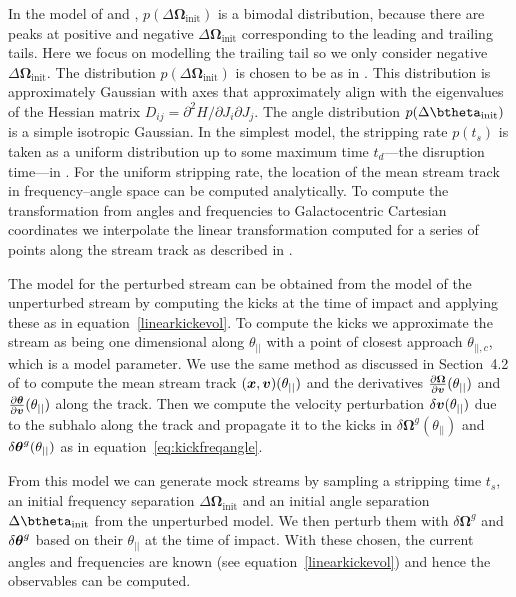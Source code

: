 \documentclass[useAMS,usenatbib,fleqn,a4paper]{mn2e}
\newcommand{\bs}[1]{\bmath{#1}}
\begin{document}
In the model of \cite{Bovy2014} and \cite{Sanders2014}, $p(\Delta\boldsymbol{\Omega}_\mathrm{init})$ is a bimodal distribution, because there are peaks at positive and negative $\Delta\boldsymbol{\Omega}_\mathrm{init}$ corresponding to the leading and trailing tails. Here we focus on modelling the trailing tail so we only consider negative $\Delta\boldsymbol{\Omega}_\mathrm{init}$. The distribution $p(\Delta\boldsymbol{\Omega}_\mathrm{init})$ is chosen to be as in \cite{Bovy2014}. This distribution is approximately Gaussian with axes that approximately align with the eigenvalues of the Hessian matrix $D_{ij}=\partial^2H/\partial J_i\partial J_j$. The angle distribution $p(\Delta\btheta_\mathrm{init})$ is a simple isotropic Gaussian. In the simplest model, the stripping rate $p(t_s)$ is taken as a uniform distribution up to some maximum time $t_d$---the disruption time---in \cite{Bovy2014}. For the uniform stripping rate, the location of the mean stream track in frequency--angle space can be computed analytically. To compute the transformation from angles and frequencies to Galactocentric Cartesian coordinates we interpolate the linear transformation computed for a series of points along the stream track as described in \cite{Bovy2014}.

The model for the perturbed stream can be obtained from the model of the unperturbed stream by computing the kicks at the time of impact and applying these as in equation~\eqref{linearkickevol}. To compute the kicks we approximate the stream as being one dimensional along $\theta_{||}$ with a point of closest approach $\theta_{||,c}$, which is a model parameter. We use the same method as discussed in Section~4.2 of \cite{Bovy2014} to compute the mean stream track $(\bs{x}, \bs{v})(\theta_{||})$ and the derivatives $\frac{\upartial \boldsymbol{\Omega}}{\upartial \bs{v}}(\theta_{||})$ and $\frac{\upartial \bs{\theta}}{\upartial \bs{v}}(\theta_{||})$ along the track. Then we compute the velocity perturbation $\delta\bs{v}(\theta_{||})$ due to the subhalo along the track and propagate it to the kicks in $\delta \boldsymbol{\Omega}^g(\theta_{||})$ and $\delta \bs{\theta}^g(\theta_{||})$ as in equation~\eqref{eq:kickfreqangle}. 

From this model we can generate mock streams by sampling a stripping time $t_s$, an initial frequency separation $\Delta\boldsymbol{\Omega}_\mathrm{init}$ and an initial angle separation $\Delta\btheta_\mathrm{init}$ from the unperturbed model. We then perturb them with $\delta \boldsymbol{\Omega}^g$ and $\delta \bs{\theta}^g$ based on their $\theta_{||}$ at the time of impact. With these chosen, the current angles and frequencies are known (see equation~\eqref{linearkickevol}) and hence the observables can be computed. 
\end{document}
